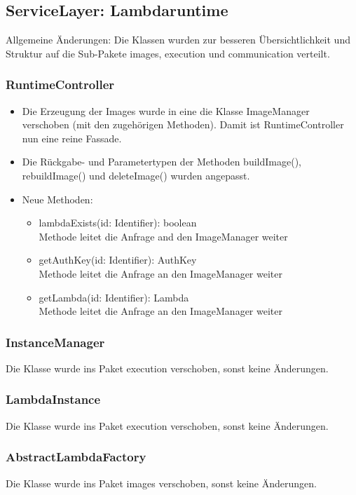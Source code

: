 \documentclass[a4paper,20pt,oneside]{book}
\begin{document}
	\subsection{ServiceLayer: Lambdaruntime}
	Allgemeine Änderungen: Die Klassen wurden zur besseren Übersichtlichkeit und Struktur auf die Sub-Pakete images, execution und communication verteilt.
	\subsubsection{RuntimeController}
	\begin{itemize}
		\item Die Erzeugung der Images wurde in eine die Klasse ImageManager verschoben (mit den zugehörigen Methoden). Damit ist RuntimeController nun eine reine Fassade.
		\item Die Rückgabe- und Parametertypen der Methoden buildImage(), rebuildImage() und deleteImage() wurden angepasst.
		\item Neue Methoden:
		\begin{itemize}
			\item lambdaExists(id: Identifier): boolean \\
			Methode leitet die Anfrage and den ImageManager weiter
			\item getAuthKey(id: Identifier): AuthKey \\
			Methode leitet die Anfrage an den ImageManager weiter
			\item getLambda(id: Identifier): Lambda \\
			Methode leitet die Anfrage an den ImageManager weiter
		\end{itemize}
	\end{itemize}
	
	\subsubsection{InstanceManager}
	Die Klasse wurde ins Paket execution verschoben, sonst keine Änderungen.	
	\subsubsection{LambdaInstance}
	Die Klasse wurde ins Paket execution verschoben, sonst keine Änderungen.
	
	\subsubsection{AbstractLambdaFactory}
	Die Klasse wurde ins Paket images verschoben, sonst keine Änderungen.
\end{document}

